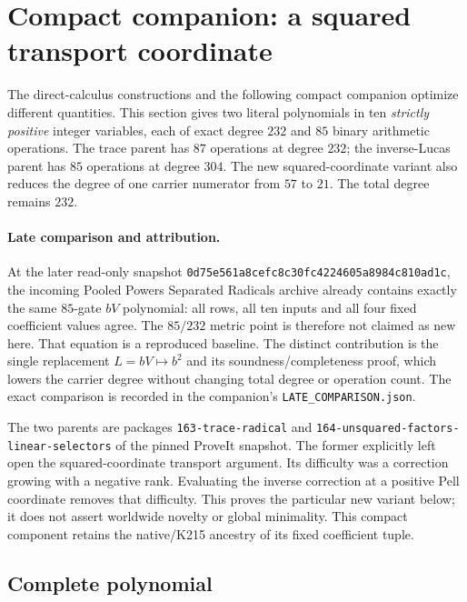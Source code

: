 \section{Compact companion: a squared transport coordinate}
\label{sec:compact-companion}

The direct-calculus constructions and the following compact companion
optimize different quantities.  This section gives two literal polynomials
in ten \emph{strictly positive} integer variables, each of exact degree
$232$ and $85$ binary arithmetic operations.  The trace parent has
$87$ operations at degree $232$; the inverse-Lucas parent has $85$
operations at degree $304$.  The new squared-coordinate variant also
reduces the degree of one carrier numerator from $57$ to $21$.
The total degree remains $232$.

\paragraph{Late comparison and attribution.}
At the later read-only snapshot
\texttt{0d75e561a8cefc8c30fc4224605a8984c810ad1c}, the incoming
Pooled Powers Separated Radicals archive already contains exactly the
same $85$-gate $bV$ polynomial: all rows, all ten inputs and all four fixed
coefficient values agree.  The $85/232$ metric point is therefore not
claimed as new here.  That equation is a reproduced baseline.  The
distinct contribution is the single replacement $L=bV\mapsto b^2$
and its soundness/completeness proof, which lowers the carrier degree
without changing total degree or operation count.  The exact comparison
is recorded in the companion's \texttt{LATE\_COMPARISON.json}.

The two parents are packages \texttt{163-trace-radical} and
\texttt{164-unsquared-factors-linear-selectors} of the pinned ProveIt
snapshot.  The former explicitly left open the squared-coordinate
transport argument.  Its difficulty was a correction growing with a
negative rank.  Evaluating the inverse correction at a positive Pell
coordinate removes that difficulty.  This proves the particular new
variant below; it does not assert worldwide novelty or global minimality.
This compact component retains the native/K215 ancestry of its fixed
coefficient tuple.

\subsection{Complete polynomial}

